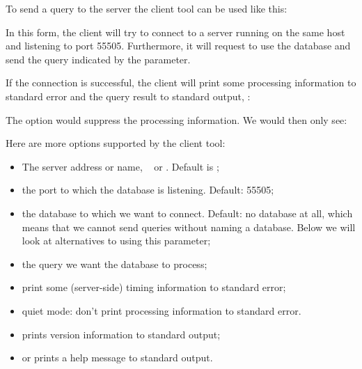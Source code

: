 To send a query to the server
the client tool can be used like this:


In this form, the client will try to connect to a server
running on the same host and listening to port 55505.
Furthermore, it will request to use the database 
and send the query indicated by the  parameter.

If the connection is successful, the client will print some
processing information to standard error and the query result
to standard output, \eg:


The option  would suppress the processing information.
We would then only see:


Here are more options supported by the client tool:
\begin{itemize}
\item {} 
The server address or name, \eg\  or
. Default is ;

\item {}
the port to which the database is listening. Default: 55505;

\item {}
the database to which we want to connect. 
Default: no database at all, which means
that we cannot send queries without naming a database.
Below we will look at alternatives to using this parameter;

\item {}
the query we want the database to process;

\item {}
print some (server-side) timing information to standard error;

\item {}
quiet mode: don't print processing information to standard error.

\item {} prints version information to standard output;
\item {} or  prints a help message to standard output.
\end{itemize}

